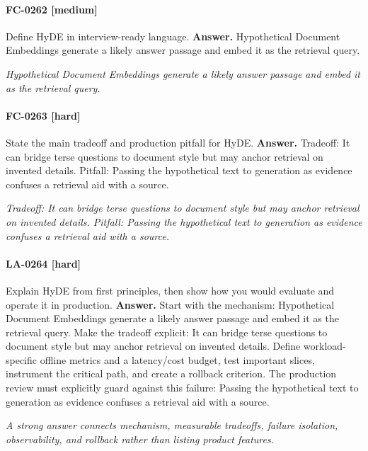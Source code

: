 \paragraph{FC-0262 [medium]} Define HyDE in interview-ready language.
\noindent\textbf{Answer.} Hypothetical Document Embeddings generate a likely answer passage and embed it as the retrieval query.
\par\textit{Hypothetical Document Embeddings generate a likely answer passage and embed it as the retrieval query.}
\paragraph{FC-0263 [hard]} State the main tradeoff and production pitfall for HyDE.
\noindent\textbf{Answer.} Tradeoff: It can bridge terse questions to document style but may anchor retrieval on invented details. Pitfall: Passing the hypothetical text to generation as evidence confuses a retrieval aid with a source.
\par\textit{Tradeoff: It can bridge terse questions to document style but may anchor retrieval on invented details. Pitfall: Passing the hypothetical text to generation as evidence confuses a retrieval aid with a source.}
\paragraph{LA-0264 [hard]} Explain HyDE from first principles, then show how you would evaluate and operate it in production.
\noindent\textbf{Answer.} Start with the mechanism: Hypothetical Document Embeddings generate a likely answer passage and embed it as the retrieval query. Make the tradeoff explicit: It can bridge terse questions to document style but may anchor retrieval on invented details. Define workload-specific offline metrics and a latency/cost budget, test important slices, instrument the critical path, and create a rollback criterion. The production review must explicitly guard against this failure: Passing the hypothetical text to generation as evidence confuses a retrieval aid with a source.
\par\textit{A strong answer connects mechanism, measurable tradeoffs, failure isolation, observability, and rollback rather than listing product features.}
